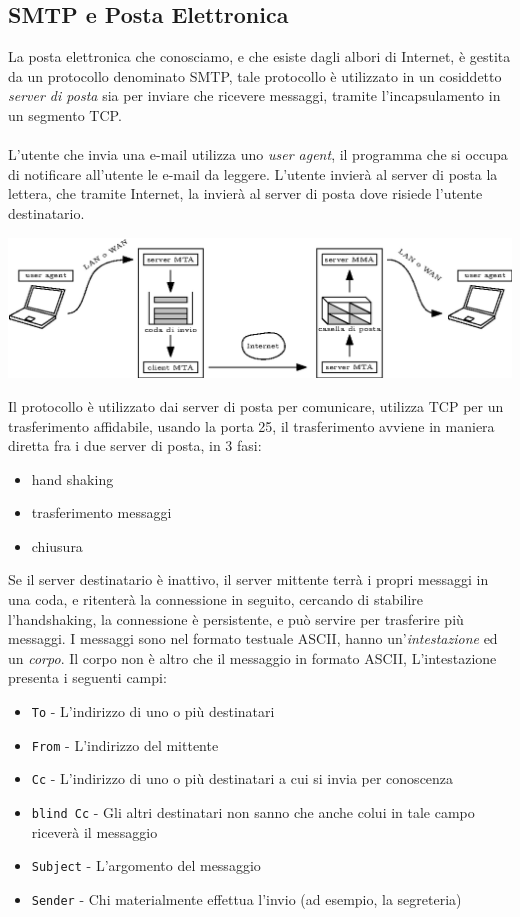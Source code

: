 \documentclass[12pt, letterpaper]{article}
\newcommand{\code}[1]{\colorbox{light-gray}{\texttt{#1}}}
\newcommand{\acc}{\\\hphantom{}\\}
\begin{document}
\subsection{SMTP e Posta Elettronica}
La posta elettronica che conosciamo, e che esiste dagli albori di
Internet, è gestita da un protocollo denominato SMTP, tale protocollo è utilizzato in un
cosiddetto \textit{server di posta} sia per inviare che ricevere messaggi, tramite
l'incapsulamento in un segmento TCP.\acc
L'utente che invia una e-mail utilizza uno \textit{user agent}, il programma che si occupa di notificare
all'utente le e-mail da leggere. L'utente invierà al server di posta la lettera, che tramite
Internet, la invierà al server di posta dove risiede l'utente destinatario.\begin{center}
    \includegraphics[width=1\textwidth ]{images/smtp.eps}
\end{center}
Il protocollo è utilizzato dai server di posta per comunicare, utilizza TCP per un trasferimento
affidabile, usando la porta 25, il trasferimento avviene in maniera diretta fra i due server di posta, in
3 fasi:\begin{itemize}
    \item hand shaking
    \item trasferimento messaggi
    \item chiusura
\end{itemize}
Se il server destinatario è inattivo, il server mittente terrà i propri messaggi in una coda, e ritenterà
la connessione in seguito, cercando di stabilire l'handshaking, la connessione è persistente, e può servire
per trasferire più messaggi. I messaggi sono nel formato testuale ASCII, hanno un'\textit{intestazione}
ed un \textit{corpo}. Il corpo non è altro che il messaggio in formato
ASCII, L'intestazione presenta i seguenti campi:\begin{itemize}
    \item \code{To} - L'indirizzo di uno o più destinatari
    \item \code{From} - L'indirizzo del mittente
    \item \code{Cc} - L'indirizzo di uno o più destinatari a cui si invia per conoscenza
    \item \code{blind Cc} - Gli altri destinatari non sanno che anche colui in tale campo riceverà il messaggio
    \item \code{Subject} - L'argomento del messaggio
    \item \code{Sender} - Chi materialmente effettua l'invio (ad esempio, la segreteria)
\end{itemize}
\end{document}
